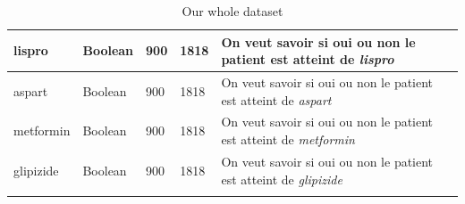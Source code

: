 \documentclass[12pt, french]{report}
\begin{document}
\begin{longtable}{ | p{} | p{} | p{}  | p{} | p{} |  }
lispro & Boolean & 900 & 1818& On veut savoir si oui ou non le patient est atteint de \textit{lispro} \\ \hline 
aspart & Boolean & 900 & 1818& On veut savoir si oui ou non le patient est atteint de \textit{aspart} \\ \hline 
metformin & Boolean & 900 & 1818& On veut savoir si oui ou non le patient est atteint de \textit{metformin} \\ \hline 
glipizide & Boolean & 900 & 1818& On veut savoir si oui ou non le patient est atteint de \textit{glipizide} \\ \hline

\caption{Our whole dataset}
\label{tab:dt}
\end{longtable}

\newpage
{}


 	
\end{document}
